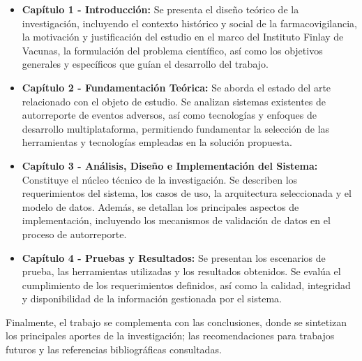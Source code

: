 \begin{itemize}
    \item \textbf{Capítulo 1 - Introducción:} Se presenta el diseño teórico de la investigación, incluyendo el contexto histórico y social de la farmacovigilancia, la motivación y justificación del estudio en el marco del Instituto Finlay de Vacunas, la formulación del problema científico, así como los objetivos generales y específicos que guían el desarrollo del trabajo.

    \item \textbf{Capítulo 2 - Fundamentación Teórica:} Se aborda el estado del arte relacionado con el objeto de estudio. Se analizan sistemas existentes de autorreporte de eventos adversos, así como tecnologías y enfoques de desarrollo multiplataforma, permitiendo fundamentar la selección de las herramientas y tecnologías empleadas en la solución propuesta.

    \item \textbf{Capítulo 3 - Análisis, Diseño e Implementación del Sistema:} Constituye el núcleo técnico de la investigación. Se describen los requerimientos del sistema, los casos de uso, la arquitectura seleccionada y el modelo de datos. Además, se detallan los principales aspectos de implementación, incluyendo los mecanismos de validación de datos en el proceso de autorreporte.

    \item \textbf{Capítulo 4 - Pruebas y Resultados:} Se presentan los escenarios de prueba, las herramientas utilizadas y los resultados obtenidos. Se evalúa el cumplimiento de los requerimientos definidos, así como la calidad, integridad y disponibilidad de la información gestionada por el sistema.
\end{itemize}

Finalmente, el trabajo se complementa con las conclusiones, donde se sintetizan los principales aportes de la investigación; las recomendaciones para trabajos futuros y las referencias bibliográficas consultadas.
